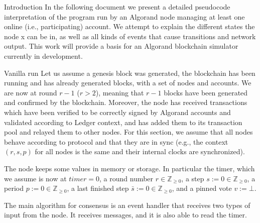 \documentclass[10pt,a4paper]{article}
\begin{document}
\begin{section}{Introduction}
In the following document we present a detailed pseudocode interpretation 
of the program run by an Algorand node managing at least one online (i.e., 
participating) account. We attempt to explain the different states the node x
can be in, as well as all kinds of events that cause transitions and network 
output. This work will provide a basis for an Algorand blockchain simulator 
currently in development.

\begin{subsection}{Vanilla run}\label{subsect:vanilla-run}
Let us assume a genesis block was generated, the blockchain has been running and
has already generated blocks, with a set of nodes and accounts. 
We are now at round $r-1$ ($r>2$), meaning
that $r-1$ blocks have been generated and confirmed by the blockchain.
Moreover, the node has received transactions which have been verified to 
be correctly signed by Algorand accounts and validated according to Ledger context, 
and has added them to its transaction pool and relayed them to other nodes.
For this section, we assume that all nodes behave according to protocol
and that they are in sync (e.g., the context $(r,s,p)$ for all nodes is 
the same and their internal clocks are synchronized).

The node keeps some values in memory or storage. In particular the 
timer, which we assume is now at $timer=0$,
a round number $r\in\mathbb{Z}_{\ge 0}$, 
a step $s:=0\in\mathbb{Z}_{\ge 0}$,
a period $p:=0\in\mathbb{Z}_{\ge 0}$, 
a last finished step $\bar{s}:=0\in\mathbb{Z}_{\ge 0}$, and 
a pinned vote $v:=\bot$.

The main algorithm for consensus is an event handler that receives two
types of input from the node. It receives messages, and it is also able
to read the timer.
%


\end{subsection}
\end{section}
\end{document}
